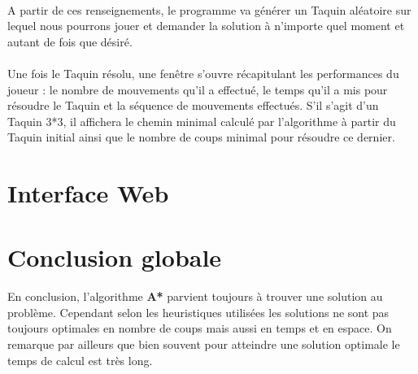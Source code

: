 \documentclass[10pt,a4paper]{report}
\begin{document}
\paragraph{}{A partir de ces renseignements, le programme va générer un Taquin aléatoire sur lequel nous pourrons jouer et demander la solution à n'importe quel moment et autant de fois que désiré.}
\paragraph{}{Une fois le Taquin résolu, une fenêtre s'ouvre récapitulant les performances du joueur : le nombre de mouvements qu'il a effectué, le temps qu'il a mis pour résoudre le Taquin et la séquence de mouvements effectués. S'il s'agit d'un Taquin 3*3, il affichera le chemin minimal calculé par l'algorithme à partir du Taquin initial ainsi que le nombre de coups minimal pour résoudre ce dernier.}
\section{Interface Web}
\section{Conclusion globale} 
\paragraph{}{En conclusion, l'algorithme \textbf{A*} parvient toujours à trouver une solution au problème. Cependant selon les heuristiques utilisées les solutions ne sont pas toujours optimales en nombre de coups mais aussi en temps et en espace. On remarque par ailleurs que bien souvent pour atteindre une solution optimale le temps de calcul est très long.}
\end{document}
